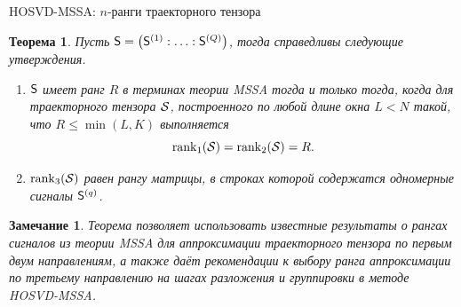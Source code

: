 \documentclass[pdf, unicode, 9pt, notheorems, handout]{beamer}
\newtheorem{theorem}{Теорема}
\newtheorem{remark}{Замечание}
\begin{document}
   \begin{frame}{HOSVD-MSSA: $n$-ранги траекторного тензора}
        \begin{theorem}
            Пусть $\mathsf{S} = \left(\mathsf{S}^{(1)} : \ldots : \mathsf{S}^{(Q)}\right)$, тогда справедливы следующие утверждения.
            \begin{enumerate}
                \item $\mathsf{S}$ имеет ранг $R$ в терминах теории \textup{MSSA} тогда и только тогда, когда для траекторного тензора $\mathcal{S}$, построенного по любой длине окна $L<N$ такой, что 
                $R \leqslant\min(L, K)$ выполняется 
                \[\operatorname{rank}_1(\mathcal{S}) = \operatorname{rank}_2(\mathcal{S}) = R.\]
                \item $\operatorname{rank}_3(\mathcal{S})$ равен рангу матрицы, 
                в строках которой содержатся одномерные сигналы $\mathsf{S}^{(q)}$.
            \end{enumerate}
        \end{theorem}
        \vspace{0.2cm}
        \begin{remark}
            Теорема позволяет использовать известные результаты о рангах сигналов из теории \textup{MSSA}
            для аппроксимации траекторного тензора по первым двум направлениям, а также даёт рекомендации к
            выбору ранга аппроксимации по третьему направлению на шагах разложения и группировки в методе \textup{HOSVD-MSSA}.
        \end{remark}
    \end{frame}
    
    
\end{document}
